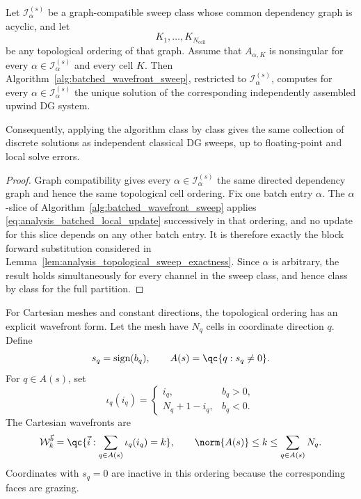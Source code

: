 \documentclass[final]{amsart}
\begin{document}
\begin{corollary}
\label{cor:analysis_batched_sweep_exactness}
Let $\mathcal I_\alpha^{(s)}$ be a graph-compatible sweep class whose
common dependency graph is acyclic, and let
\[
K_1,\dots,K_{N_{\mathrm{cell}}}
\]
be any topological ordering of that graph. Assume that
$A_{\alpha,K}$ is nonsingular for every
$\alpha\in\mathcal I_\alpha^{(s)}$ and every cell $K$.
Then Algorithm~\ref{alg:batched_wavefront_sweep}, restricted to
$\mathcal I_\alpha^{(s)}$, computes for every
$\alpha\in\mathcal I_\alpha^{(s)}$ the unique solution of the
corresponding independently assembled upwind DG system.

Consequently, applying the algorithm class by class gives the same
collection of discrete solutions as independent classical DG sweeps,
up to floating-point and local solve errors.
\end{corollary}

\begin{proof}
Graph compatibility gives every
$\alpha\in\mathcal I_\alpha^{(s)}$ the same directed dependency graph
and hence the same topological cell ordering. Fix one batch entry
$\alpha$. The $\alpha$-slice of
Algorithm~\ref{alg:batched_wavefront_sweep} applies
\eqref{eq:analysis_batched_local_update} successively in that ordering,
and no update for this slice depends on any other batch entry.
It is therefore exactly the block forward substitution considered in
Lemma~\ref{lem:analysis_topological_sweep_exactness}.
Since $\alpha$ is arbitrary, the result holds simultaneously for every
channel in the sweep class, and hence class by class for the full
partition.
\end{proof}

For Cartesian meshes and constant directions, the topological ordering
has an explicit wavefront form. Let the mesh have $N_q$ cells in
coordinate direction $q$. Define
\begin{equation}
s_q=\operatorname{sign}(b_q),
\qquad
A(s)=\qc{q:s_q\neq0}.
\end{equation}
For $q\in A(s)$, set
\begin{equation}
\iota_q(i_q)
=
\begin{cases}
i_q, & b_q>0,\\
N_q+1-i_q, & b_q<0.
\end{cases}
\label{eq:analysis_directional_index}
\end{equation}
The Cartesian wavefronts are
\begin{equation}
\mathcal{W}^{\vec b}_k
=
\qc{
\vec i:
\sum_{q\in A(s)}
\iota_q(i_q)
=
k
},
\qquad
\norm{A(s)}\leq k\leq \sum_{q\in A(s)}N_q.
\label{eq:analysis_wavefronts}
\end{equation}
Coordinates with $s_q=0$ are inactive in this ordering because the
corresponding faces are grazing.
\end{document}
